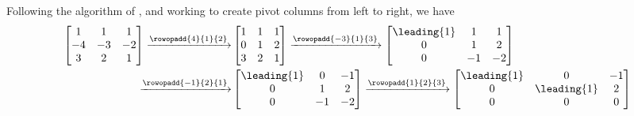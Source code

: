 Following the algorithm of , and working to create pivot columns from left to right, we have
%
\begin{align*}
%
\begin{bmatrix}
1 & 1 & 1 \\
-4 & -3 & -2 \\
3 & 2 & 1
\end{bmatrix}
%
\xrightarrow{\rowopadd{4}{1}{2}}
&
\begin{bmatrix}
1 & 1 & 1 \\
0 & 1 & 2 \\
3 & 2 & 1
\end{bmatrix}
%
\xrightarrow{\rowopadd{-3}{1}{3}}
\begin{bmatrix}
\leading{1} & 1 & 1 \\
0 & 1 & 2 \\
0 & -1 & -2
\end{bmatrix}\\
%
\xrightarrow{\rowopadd{-1}{2}{1}}
&
\begin{bmatrix}
\leading{1} & 0 & -1 \\
0 & 1 & 2 \\
0 & -1 & -2
\end{bmatrix}
%
\xrightarrow{\rowopadd{1}{2}{3}}
\begin{bmatrix}
\leading{1} & 0 & -1 \\
0 & \leading{1} & 2 \\
0 & 0 & 0
\end{bmatrix}
%
\end{align*}
%
